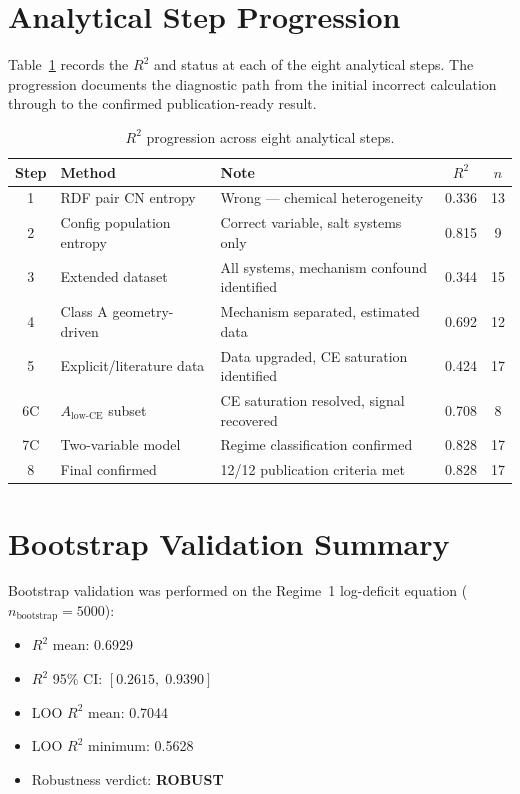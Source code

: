 \documentclass[12pt,letterpaper]{article}
\begin{document}
\section{Analytical Step Progression}
\label{app:steps}

Table~\ref{tab:progression} records the $R^{2}$ and
status at each of the eight analytical steps.
The progression documents the diagnostic path from the
initial incorrect calculation through to the confirmed
publication-ready result.

\begin{table}[h!]
\centering
\caption{$R^{2}$ progression across eight analytical
steps.}
\label{tab:progression}
\begin{tabularx}{\textwidth}{clXcc}
\toprule
Step & Method & Note & $R^{2}$ & $n$ \\
\midrule
1  & RDF pair CN entropy
   & Wrong --- chemical heterogeneity
   & 0.336 & 13 \\
2  & Config population entropy
   & Correct variable, salt systems only
   & 0.815 & 9  \\
3  & Extended dataset
   & All systems, mechanism confound identified
   & 0.344 & 15 \\
4  & Class A geometry-driven
   & Mechanism separated, estimated data
   & 0.692 & 12 \\
5  & Explicit/literature data
   & Data upgraded, CE saturation identified
   & 0.424 & 17 \\
6C & $A_{\mathrm{low\text{-}CE}}$ subset
   & CE saturation resolved, signal recovered
   & 0.708 & 8  \\
7C & Two-variable model
   & Regime classification confirmed
   & 0.828 & 17 \\
8  & Final confirmed
   & 12/12 publication criteria met
   & 0.828 & 17 \\
\bottomrule
\end{tabularx}
\end{table}

\section{Bootstrap Validation Summary}
\label{app:bootstrap}

Bootstrap validation was performed on the Regime~1
log-deficit equation
($n_{\mathrm{bootstrap}} = 5000$):

\begin{itemize}
  \item $R^{2}$ mean: 0.6929
  \item $R^{2}$ 95\% CI: $[0.2615,\; 0.9390]$
  \item LOO $R^{2}$ mean: 0.7044
  \item LOO $R^{2}$ minimum: 0.5628
  \item Robustness verdict: \textbf{ROBUST}
\end{itemize}
\end{document}
